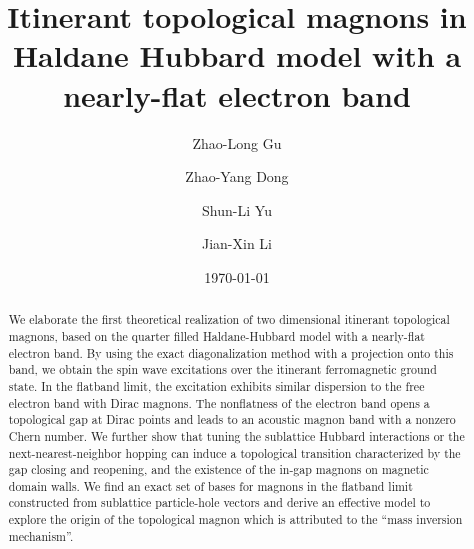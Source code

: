 \documentclass[amsmath,superscriptaddress,showpacs,aps,prl,twocolumn]{revtex4-1}
\begin{document}
\title{Itinerant topological magnons in Haldane Hubbard model with a nearly-flat electron band}
\author{Zhao-Long Gu}
\author{Zhao-Yang Dong}
\author{Shun-Li Yu}
\author{Jian-Xin Li}
\date{\today}

\begin{abstract}

\par We elaborate the first theoretical realization of two dimensional itinerant topological magnons, based on the quarter filled Haldane-Hubbard model with a nearly-flat electron band. By using the exact diagonalization method with a projection onto this band, we obtain the spin wave excitations over the itinerant ferromagnetic ground state. In the flatband limit, the excitation exhibits similar dispersion to the free electron band with Dirac magnons. The nonflatness of the electron band opens a topological gap at Dirac points and leads to an acoustic magnon band with a nonzero Chern number. We further show that tuning the sublattice Hubbard interactions or the next-nearest-neighbor hopping can induce a topological transition characterized by the gap closing and reopening, and the existence of the in-gap magnons on magnetic domain walls. We find an exact set of bases for magnons in the flatband limit constructed from sublattice particle-hole vectors and derive an effective model to explore the origin of the topological magnon which is attributed to the ``mass inversion mechanism''.

\end{abstract}

\maketitle
\end{document}

